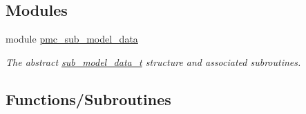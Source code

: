 \subsection*{Modules}
\begin{DoxyCompactItemize}
\item 
module \mbox{\hyperlink{namespacepmc__sub__model__data}{pmc\+\_\+sub\+\_\+model\+\_\+data}}
\begin{DoxyCompactList}\small\item\em The abstract \mbox{\hyperlink{structpmc__sub__model__data_1_1sub__model__data__t}{sub\+\_\+model\+\_\+data\+\_\+t}} structure and associated subroutines. \end{DoxyCompactList}\end{DoxyCompactItemize}
\subsection*{Functions/\+Subroutines}
